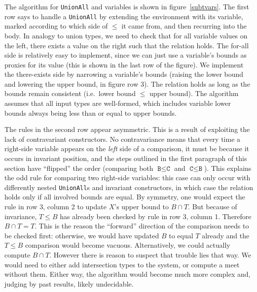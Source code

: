 The algorithm for \texttt{UnionAll} and variables is shown in figure~\ref{subtvars}.
The first row says to handle a \texttt{UnionAll} by extending the environment
with its variable, marked according to which side of $\leq$ it came from,
and then recurring into the body.
In analogy to union types, we need to check that for all variable values on
the left, there exists a value on the right such that the relation holds.
The for-all side is relatively easy to implement, since we can just use
a variable's bounds as proxies for its value (this is shown in
the last row of the figure).
We implement the there-exists side by narrowing a variable's bounds
(raising the lower bound and lowering the upper bound, in figure row 3).
The relation holds
as long as the bounds remain consistent (i.e.\ lower bound $\leq$
upper bound).
The algorithm assumes that all input types are well-formed,
which includes variable lower bounds always being less than or equal to
upper bounds.

The rules in the second row appear asymmetric.
This is a result of exploiting the lack of contravariant constructors.
No contravariance means that every time a
right-side variable appears on the \emph{left} side of a comparison,
it must be because it occurs in invariant position, and the steps outlined
in the first paragraph of this section have ``flipped'' the order
(comparing both $\texttt{B}\leq\texttt{C}$ and $\texttt{C}\leq\texttt{B}$).
This explains the odd rule for comparing two right-side variables:
this case can only occur with differently nested \texttt{UnionAll}s and
invariant constructors, in which case the relation holds only if
all involved bounds are equal.
By symmetry, one would expect the rule in row 3, column 2 to
update $X$'s upper bound to $B\cap T$. But because of invariance,
$T\leq B$ has already been checked by rule in row 3, column 1.
Therefore $B\cap T = T$. This is the reason the ``forward''
direction of the comparison needs to be checked first: otherwise,
we would have updated $B$ to equal $T$ already and the $T\leq B$
comparison would become vacuous. Alternatively, we could actually
compute $B\cap T$. However there is reason to suspect that
trouble lies that way. We would need to either add intersection types
to the system, or compute a meet without them. Either way, the
algorithm would become much more complex and, judging by past
results, likely undecidable.


